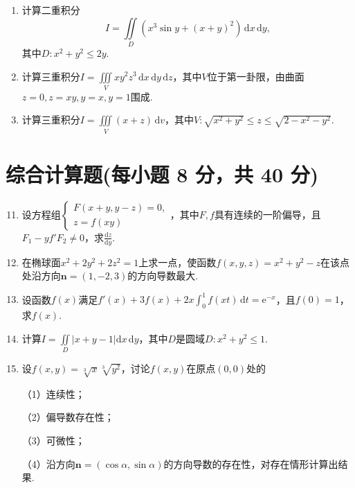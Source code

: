 \documentclass[../main.tex]{subfiles}
\begin{document}
\begin{enumerate}
    \item 计算二重积分
          \[
              I=\iint\limits_{D}\left(x^3\sin y+(x+y)^{2}\right)\,\mathrm{d}x\,\mathrm{d}y,
          \]
          其中$D:x^{2}+y^{2}\leq2y$.
          \vspace{11em}

    \item 计算三重积分$I=\iiint\limits_{V}xy^{2}z^{3}\,\mathrm{d}x\,\mathrm{d}y\,\mathrm{d}z$，其中$V$位于第一卦限，由曲面$z=0,z=xy,y=x,y=1$围成.
          \vspace{11em}

    \item 计算三重积分$I=\iiint\limits_{V}(x+z)\,\mathrm{d}v$，其中$V:\sqrt{x^{2}+y^{2}}
              \leq z\leq\sqrt{2-x^{2}-y^{2}}$.
          \vspace{11em}
\end{enumerate}

\section{综合计算题(每小题 8 分，共 40 分)}
\begin{enumerate}
    \setcounter{enumi}{10}
    \item 设方程组$\begin{cases}
                  F(x+y,y-z)=0, \\
                  z=f(xy)
              \end{cases}$，其中$F,f$具有连续的一阶偏导，且$F_{1}-yf'F_{2}\neq0$，求$\frac{\mathrm{d}z}{\mathrm{d}y}$.
          \vspace{10em}

    \item 在椭球面$x^{2}+2y^{2}+2z^{2}=1$上求一点，使函数$f(x,y,z)=x^{2}+y^{2}
              -z$在该点处沿方向$\boldsymbol{n}=(1,-2,3)$的方向导数最大.
          \vspace{10em}

    \item 设函数$f(x)$满足$f'(x)+3f(x)+2x\int_{0}^{1}f(xt)\,\mathrm{d}t=\mathrm{e}^{-x}$，且$f(0)=1$，求$f(x)$.
          \vspace{10em}

    \item 计算$I=\iint\limits_{D}|x+y-1|\mathrm{d}x\,\mathrm{d}y$，其中$D$是圆域$D:x^{2}+y^{2}\leq1$.
          \vspace{10em}

    \item 设$f(x,y)=\sqrt[3]{x}\sqrt[3]{y^{2}}$，讨论$f(x,y)$在原点$(0,0)$处的

          （1）连续性；

          （2）偏导数存在性；

          （3）可微性；

          （4）沿方向$\boldsymbol{n}=(\cos\alpha,\sin\alpha)$的方向导数的存在性，对存在情形计算出结果.
          \vspace{10em}
\end{enumerate}
\end{document}
